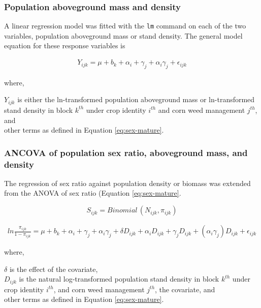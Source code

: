 \documentclass[
]{article}
\begin{document}
\hypertarget{population-aboveground-mass-and-density-1}{%
\subsubsection*{Population aboveground mass and density}\label{population-aboveground-mass-and-density-1}}

A linear regression model was fitted with the \texttt{lm} command on each of the two variables, population aboveground mass or stand density. The general model equation for these response variables is

\begin{align}
Y_{ijk} = \mu + b_k + \alpha_i + \gamma_j +\alpha_i \gamma_j + \epsilon_{ijk} \label{eq:pop-mass-dens}
\end{align}

where,

\(Y_{ijk}\) is either the ln-transformed population aboveground mass or ln-transformed stand density in block \(k^{th}\) under crop identity \(i^{th}\) and corn weed management \(j^{th}\), and\\
other terms as defined in Equation \eqref{eq:sex-mature}.

\hypertarget{ancova-of-population-sex-ratio-aboveground-mass-and-density}{%
\subsubsection*{ANCOVA of population sex ratio, aboveground mass, and density}\label{ancova-of-population-sex-ratio-aboveground-mass-and-density}}

The regression of sex ratio against population density or biomass was extended from the ANOVA of sex ratio (Equation \eqref{eq:sex-mature}.

\[ S_{ijk} = Binomial\,(N_{ijk},\pi_{ijk}) \]

\begin{align}
ln \frac{\pi_{ijk}}{1-\pi_{ijk}} = \mu + b_k + \alpha_i + \gamma_j +\alpha_i \gamma_j + \delta D_{ijk}  + \alpha_i D_{ijk} + \gamma_j D_{ijk} + (\alpha_i \gamma_j)D_{ijk} + \epsilon_{ijk} \label{eq:sex-mature-anc}
\end{align}

where,

\(\delta\) is the effect of the covariate,\\
\(D_{ijk}\) is the natural log-transformed population stand density in block \(k^{th}\) under crop identity \(i^{th}\), and corn weed management \(j^{th}\), the covariate, and\\
other terms as defined in Equation \eqref{eq:sex-mature}.
\end{document}

